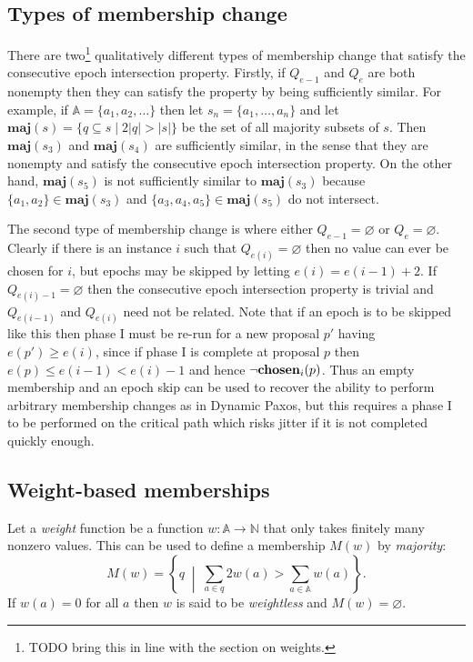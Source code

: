 \documentclass[journal]{IEEEtran}
\begin{document}
\subsection{Types of membership change}\label{types-of-membership-change}

\def\maj#1{\mathbf{maj}(#1)}

There are two\footnote{TODO bring this in line with
the section on weights.} qualitatively different types of membership change that satisfy
the consecutive epoch intersection property. Firstly, if $Q_{e-1}$ and $Q_e$
are both nonempty then they can satisfy the property by being sufficiently
similar. For example, if $\mathbb A = \{ a_1, a_2, \ldots \}$ then let $s_n =
\{a_1, \ldots, a_n\}$ and let $\maj{s} = \{ q \subseteq s \mid 2 |q| > |s| \}$
be the set of all majority subsets of $s$. Then $\maj{s_3}$ and $\maj{s_4}$ are
sufficiently similar, in the sense that they are nonempty and satisfy the
consecutive epoch intersection property. On the other hand, $\maj{s_5}$ is not
sufficiently similar to $\maj{s_3}$ because $\{a_1, a_2\} \in \maj{s_3}$ and
$\{a_3, a_4, a_5\} \in \maj{s_5}$ do not intersect.

The second type of membership change is where either $Q_{e-1} = \varnothing$ or
$Q_e = \varnothing$. Clearly if there is an instance $i$ such that $Q_{e(i)} =
\varnothing$ then no value can ever be chosen for $i$, but epochs may be
skipped by letting $e(i) = e(i-1) + 2$. If $Q_{e(i)-1} = \varnothing$ then the
consecutive epoch intersection property is trivial and $Q_{e(i-1)}$ and
$Q_{e(i)}$ need not be related. Note that if an epoch is to be skipped like
this then phase I must be re-run for a new proposal $p'$ having $e(p') \ge
e(i)$, since if phase I is complete at proposal $p$ then $e(p) \le e(i-1) <
e(i) - 1$ and hence $\neg\mathbf{chosen}_{i}(p)$. Thus an empty membership and an epoch
skip can be used to recover the ability to perform arbitrary membership changes
as in Dynamic Paxos, but this requires a phase I to be performed on the
critical path which risks jitter if it is not completed quickly enough.


\subsection{Weight-based memberships}
\label{weight-based-memberships}

Let a \textit{weight} function be a function $w : \mathbb A \to \mathbb N$ that
only takes finitely many nonzero values. This can be used to define a
membership $M(w)$ by \textit{majority}: \[M(w) = \left\{ q \;\middle|\; \sum_{a \in q} 2
w(a) > \sum_{a \in \mathbb A} w(a) \right\}.\] If $w(a) = 0$ for all $a$ then
$w$ is said to be \textit{weightless} and $M(w) = \varnothing$.
\end{document}
